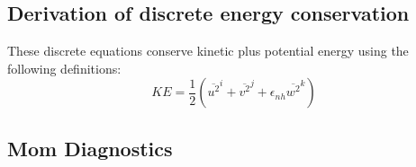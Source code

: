 \subsection{Derivation of discrete energy conservation}

These discrete equations conserve kinetic plus potential energy using the
following definitions:
\begin{equation}
KE = \frac{1}{2} \left( \overline{ u^2 }^i + \overline{ v^2 }^j +
\epsilon_{nh} \overline{ w^2 }^k \right)
\end{equation}

\subsection{Mom Diagnostics}
\label{sec:pkg:mom_common:diagnostics}

